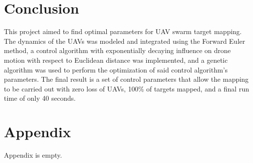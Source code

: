 \documentclass[a4paper,12pt]{report}
\begin{document}
\section{Conclusion}
This project aimed to find optimal parameters for UAV swarm target mapping. The dynamics of the UAVs was modeled and integrated using the Forward Euler method, a control algorithm with exponentially decaying influence on drone motion with respect to Euclidean distance was implemented, and a genetic algorithm was used to perform the optimization of said control algorithm's parameters. The final result is a set of control parameters that allow the mapping to be carried out with zero loss of UAVs, 100\% of targets mapped, and a final run time of only 40 seconds.

\section{Appendix}
Appendix is empty.
\end{document}
